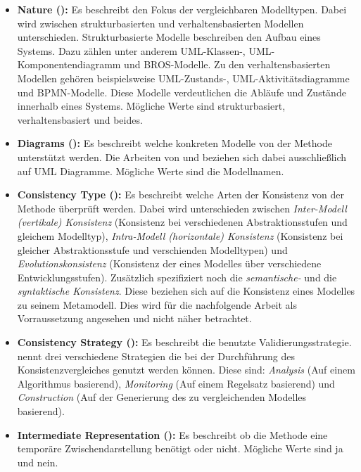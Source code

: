 \begin{itemize}
    \item \textbf{Nature (\cite{Usman2008}):}
    Es beschreibt den Fokus der vergleichbaren Modelltypen.
    Dabei wird zwischen strukturbasierten und verhaltensbasierten Modellen unterschieden.
    Strukturbasierte Modelle beschreiben den Aufbau eines Systems. Dazu zählen unter anderem UML-Klassen-, UML-Komponentendiagramm und BROS-Modelle.
    Zu den verhaltensbasierten Modellen gehören beispielsweise UML-Zustands-, UML-Aktivitätsdiagramme und BPMN-Modelle.
    Diese Modelle verdeutlichen die Abläufe und Zustände innerhalb eines Systems.
    Mögliche Werte sind strukturbasiert, verhaltensbasiert und beides.
    \item \textbf{Diagrams (\cite{Usman2008}):}
    Es beschreibt welche konkreten Modelle von der Methode unterstützt werden.
    Die Arbeiten von \cite{Usman2008} und \cite{Lucas2009} beziehen sich dabei ausschließlich auf UML Diagramme.
    Mögliche Werte sind die Modellnamen.
    \item \textbf{Consistency Type (\cite{Usman2008}):}
    Es beschreibt welche Arten der Konsistenz von der Methode überprüft werden.
    Dabei wird unterschieden zwischen \emph{Inter-Modell (vertikale) Konsistenz} (Konsistenz bei verschiedenen Abstraktionsstufen und gleichem Modelltyp), \emph{Intra-Modell (horizontale) Konsistenz} (Konsistenz bei gleicher Abstraktionsstufe und verschienden Modelltypen) und \emph{Evolutionskonsistenz} (Konsistenz der eines Modelles über verschiedene Entwicklungsstufen).
    Zusätzlich spezifiziert \cite{Usman2008} noch die \emph{semantische-} und die \emph{syntaktische Konsistenz}.
    Diese beziehen sich auf die Konsistenz eines Modelles zu seinem Metamodell.
    Dies wird für die nachfolgende Arbeit als Vorraussetzung angesehen und nicht näher betrachtet.
    \item \textbf{Consistency Strategy (\cite{Usman2008}):}
    Es beschreibt die benutzte Validierungsstrategie.
    \cite{Usman2008} nennt drei verschiedene Strategien die bei der Durchführung des Konsistenzvergleiches genutzt werden können.
    Diese sind: \emph{Analysis} (Auf einem Algorithmus basierend), \emph{Monitoring} (Auf einem Regelsatz basierend) und \emph{Construction} (Auf der Generierung des zu vergleichenden Modelles basierend).
    \item \textbf{Intermediate Representation (\cite{Usman2008}):}
    Es beschreibt ob die Methode eine temporäre Zwischendarstellung benötigt oder nicht.
    Mögliche Werte sind ja und nein. 

\end{itemize}
